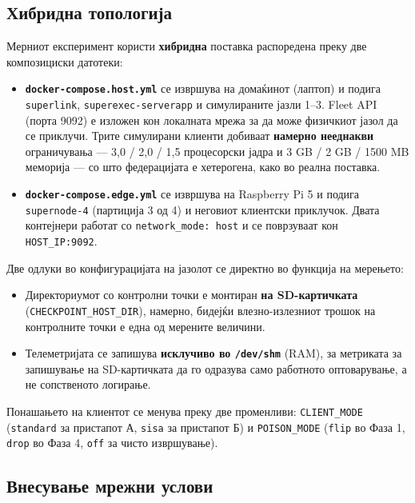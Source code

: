 \subsection{Хибридна топологија}

Мерниот експеримент користи \textbf{хибридна} поставка распоредена преку две композициски
датотеки:

\begin{itemize}
  \item \textbf{\texttt{docker-compose.host.yml}} се извршува на домаќинот (лаптоп) и подига \texttt{superlink}, \texttt{superexec-serverapp} и симулираните јазли 1–3. Fleet API (порта 9092) е изложен кон локалната мрежа за да може физичкиот јазол да се приклучи. Трите симулирани клиенти добиваат \textbf{намерно нееднакви} ограничувања --- 3,0 / 2,0 / 1,5 процесорски јадра и 3 GB / 2 GB / 1500 MB меморија --- со што федерацијата е хетерогена, како во реална поставка.
  \item \textbf{\texttt{docker-compose.edge.yml}} се извршува на Raspberry Pi 5 и подига \texttt{supernode-4} (партиција 3 од 4) и неговиот клиентски приклучок. Двата контејнери работат со \texttt{network\_mode: host} и се поврзуваат кон \texttt{HOST\_IP:9092}.
\end{itemize}

Две одлуки во конфигурацијата на јазолот се директно во функција на мерењето:

\begin{itemize}
  \item Директориумот со контролни точки е монтиран \textbf{на SD-картичката} (\texttt{CHECKPOINT\_HOST\_DIR}), намерно, бидејќи влезно-излезниот трошок на контролните точки е една од мерените величини.
  \item Телеметријата се запишува \textbf{исклучиво во \texttt{/dev/shm}} (RAM), за метриката за запишување на SD-картичката да го одразува само работното оптоварување, а не сопственото логирање.
\end{itemize}

Понашањето на клиентот се менува преку две променливи: \texttt{CLIENT\_MODE} (\texttt{standard} за
пристапот А, \texttt{sisa} за пристапот Б) и \texttt{POISON\_MODE} (\texttt{flip} во Фаза 1, \texttt{drop} во Фаза 4,
\texttt{off} за чисто извршување).

\subsection{Внесување мрежни услови}

